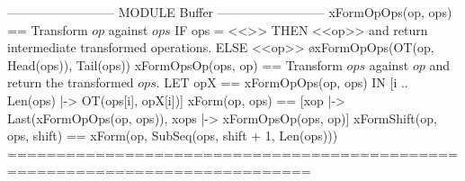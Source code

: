 \documentclass{article}
\begin{document}
\begin{tla}
-------------------------- MODULE Buffer --------------------------
xFormOpOps(op, ops) == \* Transform $op$ against $ops$
    IF ops = <<>> THEN <<op>> \* and return intermediate transformed operations.
    ELSE <<op>> \o xFormOpOps(OT(op, Head(ops)), Tail(ops))
xFormOpsOp(ops, op) == \* Transform $ops$ against $op$ and return the transformed $ops$.
    LET opX == xFormOpOps(op, ops)
    IN  [i  .. Len(ops) |-> OT(ops[i], opX[i])]
xForm(op, ops) ==
    [xop |-> Last(xFormOpOps(op, ops)), xops |-> xFormOpsOp(ops, op)]
xFormShift(op, ops, shift) == xForm(op, SubSeq(ops, shift + 1, Len(ops)))
=============================================================================
\end{tla}
\end{document}
